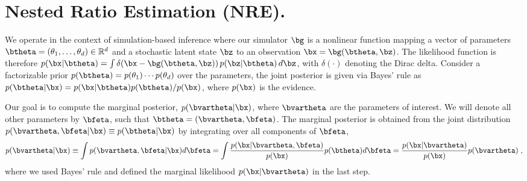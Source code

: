 \section{Nested Ratio Estimation (NRE).} 
% 
We operate in the context of simulation-based inference where our simulator $\bg$ is a nonlinear function mapping a vector of parameters $\btheta= (\theta_{1}, \dots, \theta_{d}) \in \mathbb{R}^{d}$ and a stochastic latent state $\bz$ to an observation $\bx = \bg(\btheta, \bz)$. The likelihood function is therefore $p(\bx \vert \btheta) = \int \delta(\bx - \bg(\btheta, \bz)) \, p(\bz \vert \btheta) \, d\bz$, with $\delta(\cdot)$ denoting the Dirac delta.  Consider a factorizable prior $p(\btheta) = p(\theta_{1}) \cdots p(\theta_{d})$ over the parameters, the joint posterior is given via Bayes' rule as $p(\btheta|\bx) = p(\bx|\btheta)p(\btheta)/p(\bx) $, where $p(\bx)$ is the evidence.

Our goal is to compute the marginal posterior, $p(\bvartheta \vert \bx)$, where $\bvartheta$ are the parameters of interest.  We will denote all other parameters by $\bfeta$, such that $\btheta = (\bvartheta, \bfeta)$. 
The marginal posterior is obtained from the joint distribution $p(\bvartheta, \bfeta|\bx) \equiv p(\btheta|\bx)$ by integrating over all components of $\bfeta$,
\begin{equation}
\label{eqn:post}
p(\bvartheta \vert \bx)  \equiv \int p(\bvartheta, \bfeta | \bx) d\bfeta
= \int \frac{p(\bx | \bvartheta, \bfeta)}{p(\bx)}  
p(\btheta) 
d\bfeta
= \frac{p(\bx|\bvartheta)}{p(\bx)}p(\bvartheta)\;,
\end{equation}
where we used Bayes' rule and defined the marginal likelihood $p(\bx|\bvartheta)$ in the last step.


